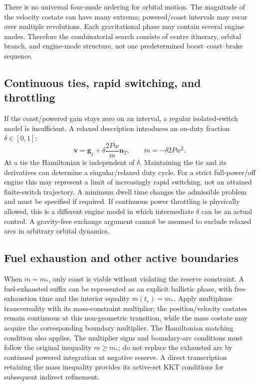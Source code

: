 \documentclass[journal, a4paper]{IEEEtran}
\begin{document}
There is no universal four-mode ordering for orbital motion. The magnitude of the velocity costate can have many extrema; powered/coast intervals may recur over multiple revolutions. Each gravitational phase may contain several engine modes. Therefore the combinatorial search consists of centre itinerary, orbital branch, and engine-mode structure, not one predetermined boost--coast--brake sequence.

\subsection{Continuous ties, rapid switching, and throttling}
If the coast/powered gain stays zero on an interval, a regular isolated-switch model is insufficient. A relaxed description introduces an on-duty fraction $\delta\in[0,1]$:
\begin{equation}
 \dot{\mathbf v}=\mathbf g_j+\delta\frac{2Pw}{m}\mathbf n_T,
 \qquad\dot m=-\delta 2Pw^2.
\end{equation}
At a tie the Hamiltonian is independent of $\delta$. Maintaining the tie and its derivatives can determine a singular/relaxed duty cycle. For a strict full-power/off engine this may represent a limit of increasingly rapid switching, not an attained finite-switch trajectory. A minimum dwell time changes the admissible problem and must be specified if required. If continuous power throttling is physically allowed, this is a different engine model in which intermediate $\delta$ can be an actual control. A gravity-free exchange argument cannot be assumed to exclude relaxed arcs in arbitrary orbital dynamics.

\subsection{Fuel exhaustion and other active boundaries}
When $m=m_*$, only coast is viable without violating the reserve constraint. A fuel-exhausted suffix can be represented as an explicit ballistic phase, with free exhaustion time and the interior equality $m(t_e)=m_*$. Apply multiphase transversality with its mass-constraint multiplier; the position/velocity costates remain continuous at this non-geometric transition, while the mass costate may acquire the corresponding boundary multiplier. The Hamiltonian matching condition also applies. The multiplier signs and boundary-arc conditions must follow the original inequality $m\ge m_*$; do not replace the exhausted arc by continued powered integration at negative reserve. A direct transcription retaining the mass inequality provides its active-set KKT conditions for subsequent indirect refinement.
\end{document}
